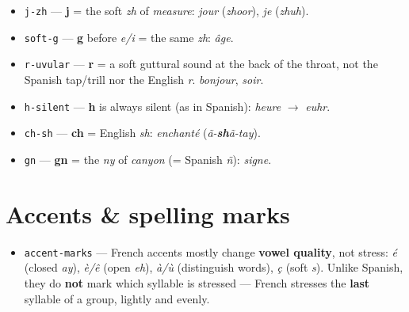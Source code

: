 \begin{itemize}
\raggedright
\setlength{\itemsep}{0.35em}
  \item \texttt{j-zh} — \textbf{j} = the soft \emph{zh} of \emph{measure}: \emph{jour} (\emph{zhoor}), \emph{je} (\emph{zhuh}).
  \item \texttt{soft-g} — \textbf{g} before \emph{e/i} = the same \emph{zh}: \emph{âge}.
  \item \texttt{r-uvular} — \textbf{r} = a soft guttural sound at the back of the throat, not the Spanish tap/trill nor the English \emph{r}. \emph{bonjour}, \emph{soir}.
  \item \texttt{h-silent} — \textbf{h} is always silent (as in Spanish): \emph{heure} $\to$ \emph{euhr}.
  \item \texttt{ch-sh} — \textbf{ch} = English \emph{sh}: \emph{enchanté} (\emph{ã-\textbf{sh}ã-tay}).
  \item \texttt{gn} — \textbf{gn} = the \emph{ny} of \emph{canyon} (= Spanish \emph{ñ}): \emph{signe}.
\end{itemize}

\section*{Accents \& spelling marks}

\begin{itemize}
\raggedright
\setlength{\itemsep}{0.35em}
  \item \texttt{accent-marks} — French accents mostly change \textbf{vowel quality}, not stress: \emph{é} (closed \emph{ay}), \emph{è/ê} (open \emph{eh}), \emph{à/ù} (distinguish words), \emph{ç} (soft \emph{s}). Unlike Spanish, they do \textbf{not} mark which syllable is stressed — French stresses the \textbf{last} syllable of a group, lightly and evenly.
\end{itemize}
